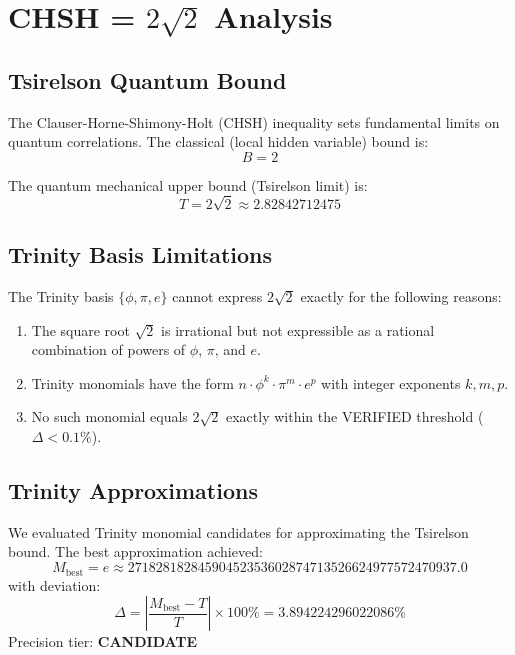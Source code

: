 \section{CHSH = $2\sqrt{2}$ Analysis}

\subsection{Tsirelson Quantum Bound}

The Clauser-Horne-Shimony-Holt (CHSH) inequality sets fundamental limits
on quantum correlations. The classical (local hidden variable) bound is:
\begin{equation}
B = 2
\end{equation}

The quantum mechanical upper bound (Tsirelson limit) is:
\begin{equation}
T = 2\sqrt{2} \approx 2.82842712475
\end{equation}

\subsection{Trinity Basis Limitations}

The Trinity basis $\{\phi, \pi, e\}$ cannot express $2\sqrt{2}$ exactly
for the following reasons:
\begin{enumerate}
\item The square root $\sqrt{2}$ is irrational but not expressible as a rational
      combination of powers of $\phi$, $\pi$, and $e$.
\item Trinity monomials have the form $n \cdot \phi^k \cdot \pi^m \cdot e^p$
      with integer exponents $k, m, p$.
\item No such monomial equals $2\sqrt{2}$ exactly within
      the VERIFIED threshold ($\Delta < 0.1\%$).
\end{enumerate}

\subsection{Trinity Approximations}

We evaluated Trinity monomial candidates for approximating the Tsirelson bound.
The best approximation achieved:
\begin{equation}M_{\text{best}} = e \approx 27182818284590452353602874713526624977572470937.0\end{equation}
with deviation:
\begin{equation}\Delta = \left|\frac{M_{\text{best}} - T}{T}\right| \times 100\% = 3.894224296022086\%\end{equation}
Precision tier: \textbf{CANDIDATE}
